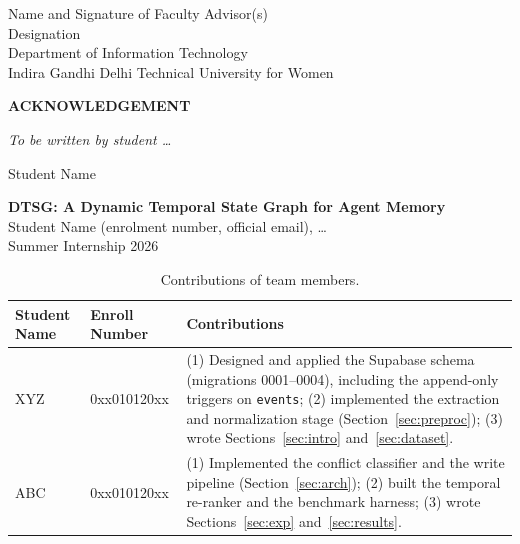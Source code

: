 \documentclass[11pt,a4paper]{article}
\newcommand{\worktitle}{DTSG: A Dynamic Temporal State Graph for Agent Memory}
\begin{document}
\vspace{2.5cm}
\noindent Name and Signature of Faculty Advisor(s)\\
Designation\\
Department of Information Technology\\
Indira Gandhi Delhi Technical University for Women
\clearpage

\thispagestyle{plain}
\begin{center}\textbf{\large ACKNOWLEDGEMENT}\end{center}
\vspace{0.5cm}
\noindent \textit{To be written by student \dots} %

\vspace{3cm}
\noindent \hfill Student Name
\clearpage

\tableofcontents
\clearpage

\setcounter{page}{1}

\begin{center}
{\Large \bfseries \worktitle}\\[0.6em]
Student Name (enrolment number, official email), \dots %
\\[0.4em]
Summer Internship 2026
\end{center}
\vspace{0.5cm}

\begin{table}[h]
\centering
\caption{Contributions of team members.}
\label{tab:contrib}
\begin{tabularx}{\textwidth}{l l X}
\toprule
\textbf{Student Name} & \textbf{Enroll Number} & \textbf{Contributions}\\
\midrule
XYZ & 0xx010120xx &
(1) Designed and applied the Supabase schema (migrations 0001--0004), including
the append-only triggers on \texttt{events};
(2) implemented the extraction and normalization stage (Section~\ref{sec:preproc});
(3) wrote Sections~\ref{sec:intro} and~\ref{sec:dataset}.\\ %
\addlinespace
ABC & 0xx010120xx &
(1) Implemented the conflict classifier and the write pipeline
(Section~\ref{sec:arch});
(2) built the temporal re-ranker and the benchmark harness;
(3) wrote Sections~\ref{sec:exp} and~\ref{sec:results}.\\ %
\bottomrule
\end{tabularx}
\end{table}
\end{document}
